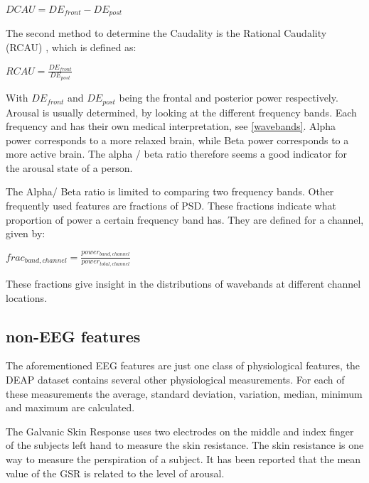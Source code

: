\begin{center}
$DCAU = DE_{front} - DE_{post}$
\end{center}

The second method to determine the Caudality is the Rational Caudality (RCAU) , which is defined as:

\begin{center}
$RCAU = \frac{DE_{front}}{DE_{post}}$
\end{center}

With $DE_{front}$ and $DE_{post}$ being the frontal and posterior power respectively. Arousal is usually determined, by looking at the different frequency bands\citep{ExtendedPaper}. Each frequency and has their own medical interpretation, see \ref{wavebands}. Alpha power corresponds to a more relaxed brain, while Beta power corresponds to a more active brain. The alpha / beta ratio therefore seems a good indicator for the arousal state of a person.

\npar

The Alpha/ Beta ratio is limited to comparing two frequency bands. Other frequently used features are fractions of PSD. These fractions indicate what proportion of power a certain frequency band has. They are defined  for a channel, given by:

\begin{center}
$frac_{band,channel} = \frac{power_{band,channel}}{power_{total,channel}}$
\end{center}

These fractions give insight in the distributions of wavebands at different channel locations.

\subsection{non-EEG features}
The aforementioned EEG features are just one class of physiological features, the DEAP dataset contains several other physiological measurements\citep{DEAP}. For each of these measurements the average, standard deviation, variation, median, minimum and maximum are calculated.

\npar

The Galvanic Skin Response  uses two electrodes on the middle and index finger of the subjects left hand to measure the skin resistance. The skin resistance is one way to measure the perspiration of a subject. It has been reported that the mean value of the GSR is related to the level of arousal\citep{GSR, DEAP}.

